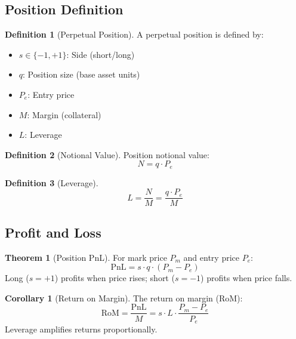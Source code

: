 \documentclass[11pt,a4paper]{article}
\theoremstyle{definition}
\newtheorem{definition}{Definition}
\newtheorem{theorem}{Theorem}
\newtheorem{corollary}{Corollary}
\begin{document}
\subsection{Position Definition}

\begin{definition}[Perpetual Position]
A perpetual position is defined by:
\begin{itemize}
\item $s \in \{-1, +1\}$: Side (short/long)
\item $q$: Position size (base asset units)
\item $P_e$: Entry price
\item $M$: Margin (collateral)
\item $L$: Leverage
\end{itemize}
\end{definition}

\begin{definition}[Notional Value]
Position notional value:
\begin{equation}
N = q \cdot P_e
\end{equation}
\end{definition}

\begin{definition}[Leverage]
\begin{equation}
L = \frac{N}{M} = \frac{q \cdot P_e}{M}
\end{equation}
\end{definition}

\subsection{Profit and Loss}

\begin{theorem}[Position PnL]
For mark price $P_m$ and entry price $P_e$:
\begin{equation}
\text{PnL} = s \cdot q \cdot (P_m - P_e)
\end{equation}
Long ($s = +1$) profits when price rises; short ($s = -1$) profits when price falls.
\end{theorem}

\begin{corollary}[Return on Margin]
The return on margin (RoM):
\begin{equation}
\text{RoM} = \frac{\text{PnL}}{M} = s \cdot L \cdot \frac{P_m - P_e}{P_e}
\end{equation}
Leverage amplifies returns proportionally.
\end{corollary}
\end{document}
